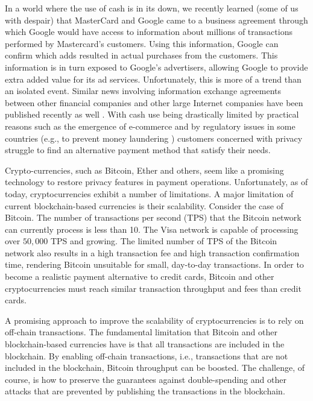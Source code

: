 In a world where the use of cash is in its down, we recently learned \cite{1} (some of us with despair) that MasterCard and Google came to a business agreement through which Google would have access to information about millions of transactions performed by Mastercard's customers. Using this information, Google can confirm which adds resulted in actual purchases from the customers. This information is in turn exposed to Google's advertisers, allowing Google to provide extra added value for its ad services. Unfortunately, this is more of a trend than an isolated event. Similar news involving information exchange agreements between other financial companies and other large Internet companies have been published recently as well \cite{2}.
With cash use being drastically limited by practical reasons such as the emergence of e-commerce and by regulatory issues in some countries (e.g., to prevent money laundering \cite{3}) customers concerned with privacy struggle to find an alternative payment method that satisfy their needs.

Crypto-currencies, such as Bitcoin, Ether and others, seem like a promising technology to restore  privacy features in payment operations. Unfortunately, as of today, cryptocurrencies exhibit a number of limitations. A major limitation of current blockchain-based currencies is their scalability. Consider the case of Bitcoin. The number of transactions per second (TPS) that the Bitcoin network can currently process is less than 10. The Visa network is capable of processing over $50,000$ TPS \cite{4} and growing. The limited number of TPS of the Bitcoin network also results in a high transaction fee and high transaction confirmation time, rendering Bitcoin unsuitable for small, day-to-day transactions. In order to become a realistic payment alternative to credit cards, Bitcoin and other cryptocurrencies must reach similar transaction throughput and fees than credit cards.

A promising approach to improve the scalability of cryptocurrencies is to rely on off-chain transactions. The fundamental limitation that Bitcoin and other blockchain-based currencies have is that all transactions are included in the blockchain. By enabling off-chain transactions, i.e., transactions that are not included in the blockchain, Bitcoin throughput can be boosted. The challenge, of course, is how to preserve the guarantees against double-spending and other attacks that are prevented by publishing the transactions in the blockchain.

